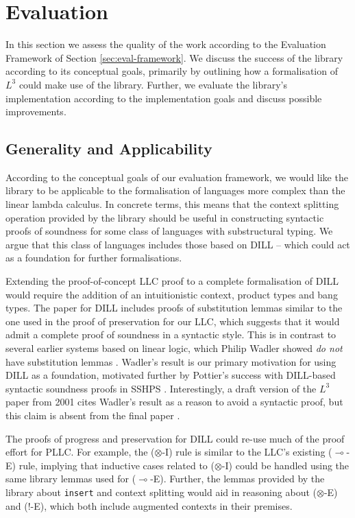 \documentclass[]{unswthesis}
\newcommand{\lolly}{\multimap}
\let\c\texttt
\let\i\textit
\begin{document}
\chapter{Evaluation}
\label{chap:eval}

In this section we assess the quality of the work according to the Evaluation Framework of Section \cref{sec:eval-framework}. We discuss the success of the library according to its conceptual goals, primarily by outlining how a formalisation of $L^3$ could make use of the library. Further, we evaluate the library's implementation according to the implementation goals and discuss possible improvements.

\section{Generality and Applicability}
\label{sec:generality}

According to the conceptual goals of our evaluation framework, we would like the library to be applicable to the formalisation of languages more complex than the linear lambda calculus. In concrete terms, this means that the context splitting operation provided by the library should be useful in constructing syntactic proofs of soundness for some class of languages with substructural typing. We argue that this class of languages includes those based on DILL -- which could act as a foundation for further formalisations.

Extending the proof-of-concept LLC proof to a complete formalisation of DILL would require the addition of an intuitionistic context, product types and bang types. The paper for DILL \cite{barber96} includes proofs of substitution lemmas similar to the one used in the proof of preservation for our LLC, which suggests that it would admit a complete proof of soundness in a syntactic style. This is in contrast to several earlier systems based on linear logic, which Philip Wadler showed \i{do not} have substitution lemmas \cite{wadlerNoSubst}. Wadler's result is our primary motivation for using DILL as a foundation, motivated further by Pottier's success with DILL-based syntactic soundness proofs in SSHPS \cite{pottier13}. Interestingly, a draft version of the $L^3$ paper from 2001 cites Wadler's result as a reason to avoid a syntactic proof, but this claim is absent from the final paper \cite{ahmed05}.

The proofs of progress and preservation for DILL could re-use much of the proof effort for PLLC. For example, the ($\otimes$-I) rule is similar to the LLC's existing ($\lolly$-E) rule, implying that inductive cases related to ($\otimes$-I) could be handled using the same library lemmas used for ($\lolly$-E). Further, the lemmas provided by the library about \c{insert} and context splitting would aid in reasoning about ($\otimes$-E) and (!-E), which both include augmented contexts in their premises.
\end{document}
